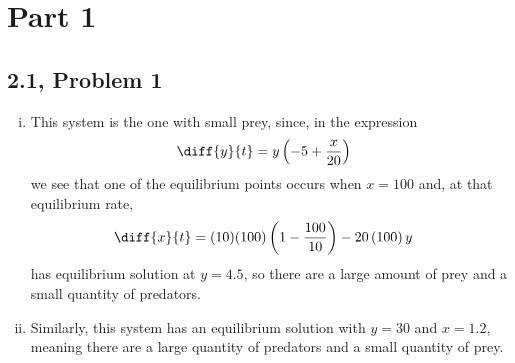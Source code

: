 \documentclass[10pt]{mypackage}
\begin{document}
\RaggedRight
\section{Part 1}%
\subsection{2.1, Problem 1}%
\begin{enumerate}[(i)]
  \item This system is the one with small prey, since, in the expression
    \begin{align*}
      \diff{y}{t} &= y\left(-5 + \frac{x}{20}\right)
    \end{align*}
    we see that one of the equilibrium points occurs when $x = 100$ and, at that equilibrium rate,
    \begin{align*}
      \diff{x}{t} &= (10)(100)\left(1-\frac{100}{10}\right) - 20\left(100\right)y
    \end{align*}
    has equilibrium solution at $y= 4.5$, so there are a large amount of prey and a small quantity of predators.
  \item Similarly, this system has an equilibrium solution with $y=30$ and $x = 1.2$, meaning there are a large quantity of predators and a small quantity of prey.
\end{enumerate}
\end{document}
